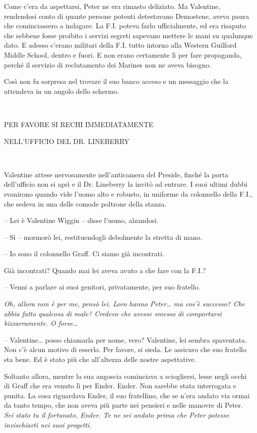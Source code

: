 {Come c'era da aspettarsi, Peter ne era rimasto deliziato. Ma Valentine,
	rendendosi conto di quante persone potenti detestavano Demostene, aveva
	paura che cominciassero a indagare. La F.I. poteva farlo ufficialmente,
	ed era risaputo che sebbene fosse proibito i servizi segreti sapevano
	mettere le mani su qualunque dato. E adesso c'erano militari della F.I.
	tutto intorno alla Western Guilford Middle School, dentro e fuori. E non
	erano certamente lì per fare propaganda, perché il servizio di
	reclutamento dei Marines non ne aveva bisogno.}

{Così non fu sorpresa nel trovare il suo banco acceso e un messaggio che
	la attendeva in un angolo dello schermo.}

{~}

\begin{center}
	{PER FAVORE SI RECHI IMMEDIATAMENTE}

{NELL'UFFICIO DEL DR. LINEBERRY}
\end{center}

{~}

{Valentine attese nervosamente nell'anticamera del Preside, finché la
	porta dell'ufficio non si aprì e il Dr. Lineberry la invitò ad entrare.
	I suoi ultimi dubbi svanirono quando vide l'uomo alto e robusto, in
	uniforme da colonnello della F.I., che sedeva in una delle comode
	poltrone della stanza.}

{-- Lei è Valentine Wiggin -- disse l'uomo, alzandosi.}

{-- Sì -- mormorò lei, restituendogli debolmente la stretta di mano.}

{-- Io sono il colonnello Graff. Ci siamo già incontrati.}

{Già incontrati? Quando mai lei aveva avuto a che fare con la F.I.?}

{-- Venni a parlare ai suoi genitori, privatamente, per suo fratello.}

\emph{{Oh, allora non è per me, pensò lei. Loro hanno Peter\ldots{} ma
		cos'è successo? Che abbia fatto qualcosa di male? Credevo che avesse
		smesso di comportarsi bizzarramente. O forse\ldots{}}}

{-- Valentine\ldots{} posso chiamarla per nome, vero? Valentine, lei
	sembra spaventata. Non c'è alcun motivo di esserlo. Per favore, si
	sieda. Le assicuro che suo fratello sta bene. Ed è stato più che
	all'altezza delle nostre aspettative.}

{Soltanto allora, mentre la sua angoscia cominciava a sciogliersi, lesse
	negli occhi di Graff che era venuto lì per Ender. Ender. Non sarebbe
	stata interrogata e punita. La cosa riguardava Ender, il suo fratellino,
	che se n'era andato via ormai da tanto tempo, che non aveva più parte
	nei pensieri e nelle manovre di Peter. \emph{Sei stato tu il fortunato,
		Ender. Te ne sei andato prima che Peter potesse invischiarti nei suoi
		progetti.}}

